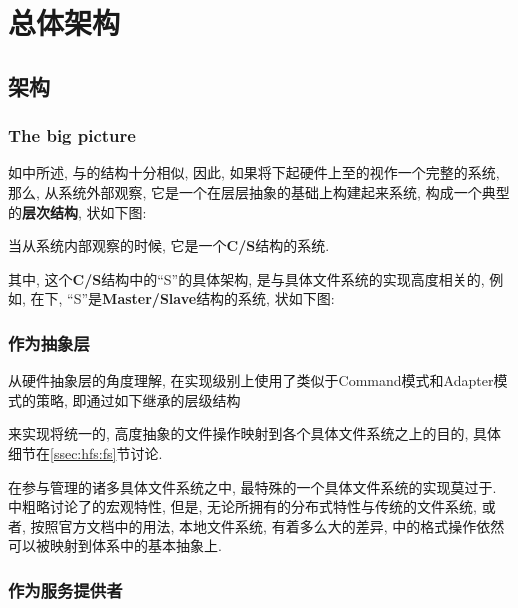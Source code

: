 \chapter{\HFS 总体架构}
\label{ch:hfs}

\section{\HFS 架构}
\label{sec:hfs:arch}

\subsection{The big picture}
\label{ssec:hfs:bigpic}

如中所述, {\HFS}与{\VFS}的结构十分相似,
因此, 如果将下起硬件上至{\HFS}的视作一个完整的系统, 那么,
从系统外部观察{\HFS}, 它是一个在层层抽象的基础上构建起来系统,
构成一个典型的\textbf{层次结构},
状如下图:


当从系统内部观察{\HFS}的时候, 它是一个\textbf{C/S}结构的系统.

其中, 这个\textbf{C/S}结构中的``S''的具体架构,
是与具体文件系统的实现高度相关的, 例如, 在{\HDFS}下,
``S''是\textbf{Master/Slave}结构的系统, 状如下图:


\subsection{作为抽象层}
\label{ssec:hfs:al}

从硬件抽象层的角度理解{\HFS},
{\HFS}在实现级别上使用了类似于Command模式和Adapter模式的策略,
即通过如下继承的层级结构


来实现将统一的, 高度抽象的文件操作映射到各个具体文件系统之上的目的,
具体细节在\ref{ssec:hfs:fs}节讨论.

在{\HFS}参与管理的诸多具体文件系统之中, 最特殊的一个具体文件系统的实现莫过于{\HDFS}.
中粗略讨论了{\HDFS}的宏观特性,
但是, 无论{\HDFS}所拥有的分布式特性与传统的文件系统, 或者, 按照官方文档中的用法, 本地文件系统,
有着多么大的差异, {\HDFS}中的格式操作依然可以被映射到{\HFS}体系中的基本抽象上.

\subsection{作为服务提供者}
\label{ssec:hfs:srv}


